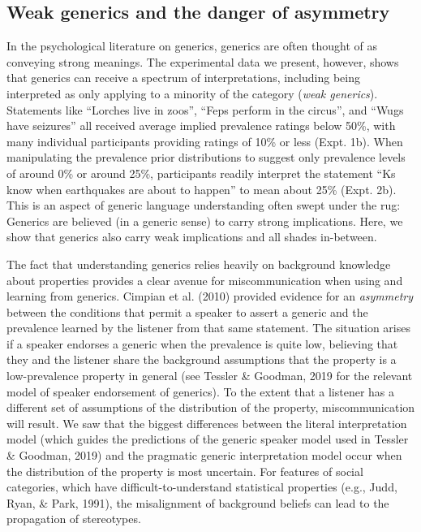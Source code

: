 \documentclass[floatsintext,doc]{apa6}
\begin{document}
\subsection{Weak generics and the danger of asymmetry}

In the psychological literature on generics, generics are often thought of as conveying strong meanings.
The experimental data we present, however, shows that generics can receive a spectrum of interpretations, including being interpreted as only applying to a minority of the category (\emph{weak generics}). 
Statements like \enquote{Lorches live in zoos}, \enquote{Feps perform in the circus}, and \enquote{Wugs have seizures} all received average implied prevalence ratings below 50\%, with many individual participants providing ratings of 10\% or less (Expt. 1b).
When manipulating the prevalence prior distributions to suggest only prevalence levels of around 0\% or around 25\%, participants readily interpret the statement \enquote{Ks know when earthquakes are about to happen} to mean about 25\% (Expt. 2b).
This is an aspect of generic language understanding often swept under the rug: Generics are believed (in a generic sense) to carry strong implications.
Here, we show that generics also carry weak implications and all shades in-between.

The fact that understanding generics relies heavily on background knowledge about properties provides a clear avenue for miscommunication when using and learning from generics.
Cimpian et al. (2010) provided evidence for an \emph{asymmetry} between the conditions that permit a speaker to assert a generic and the prevalence learned by the listener from that same statement. 
The situation arises if a speaker endorses a generic when the prevalence is quite low, believing that they and the listener share the background assumptions that the property is a low-prevalence property in general (see Tessler \& Goodman, 2019 for the relevant model of speaker endorsement of generics).
To the extent that a listener has a different set of assumptions of the distribution of the property, miscommunication will result.
We saw that the biggest differences between the literal interpretation model (which guides the predictions of the generic speaker model used in Tessler \& Goodman, 2019) and the pragmatic generic interpretation model occur when the distribution of the property is most uncertain.
For features of social categories, which have difficult-to-understand statistical properties (e.g., Judd, Ryan, \& Park, 1991), the misalignment of background beliefs can lead to the propagation of stereotypes.
\end{document}
